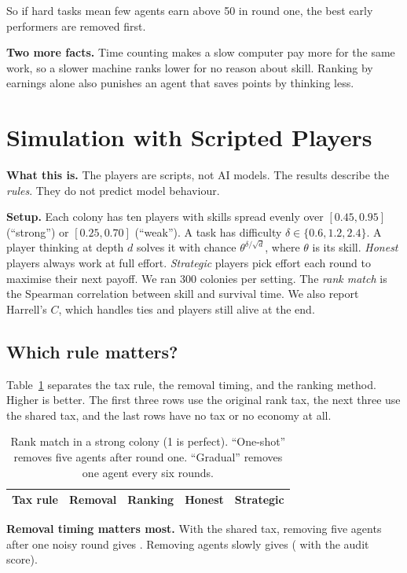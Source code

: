 \documentclass[conference]{IEEEtran}
\theoremstyle{plain}
\begin{document}
So if hard tasks mean few agents earn above 50 in round one, the best early performers are removed first.

\textbf{Two more facts.} Time counting makes a slow computer pay more for the same work, so a slower machine ranks lower for no reason about skill. Ranking by earnings alone also punishes an agent that saves points by thinking less.

\section{Simulation with Scripted Players}
\label{sec:sim}
\textbf{What this is.} The players are scripts, not AI models. The results describe the \emph{rules}. They do not predict model behaviour.

\textbf{Setup.} Each colony has ten players with skills spread evenly over $[0.45,0.95]$ (``strong'') or $[0.25,0.70]$ (``weak''). A task has difficulty $\delta\in\{0.6,1.2,2.4\}$. A player thinking at depth $d$ solves it with chance $\theta^{\delta/\sqrt d}$, where $\theta$ is its skill. \emph{Honest} players always work at full effort. \emph{Strategic} players pick effort each round to maximise their next payoff. We ran 300 colonies per setting. The \emph{rank match} is the Spearman correlation between skill and survival time. We also report Harrell's $C$, which handles ties and players still alive at the end.

\subsection{Which rule matters?}
Table~\ref{tab:rules} separates the tax rule, the removal timing, and the ranking method. Higher is better. The first three rows use the original rank tax, the next three use the shared tax, and the last rows have no tax or no economy at all.

\begin{table}[!t]
\caption{Rank match in a strong colony (1 is perfect). ``One-shot'' removes five agents after round one. ``Gradual'' removes one agent every six rounds.}
\label{tab:rules}
\centering
\small
\begin{tabular}{@{}lllcc@{}}
\toprule
Tax rule & Removal & Ranking & Honest & Strategic \\
\midrule

\bottomrule
\end{tabular}
\end{table}

\textbf{Removal timing matters most.} With the shared tax, removing five agents after one noisy round gives \NVLinCull{}. Removing agents slowly gives \NVLinGrad{} (\NVLinGradAudit{} with the audit score).
\end{document}
